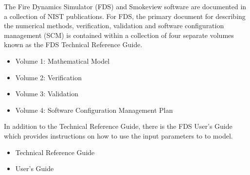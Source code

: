\documentclass[10pt]{article}
\begin{document}
The Fire Dynamics Simulator (FDS) and Smokeview software are documented in a collection of NIST publications.
For FDS, the primary document for describing the numerical methods, verification, validation and software configuration management (SCM) is contained within a collection of four separate volumes known as the FDS Technical Reference Guide.
\newline


\begin{itemize}
\item{Volume 1: Mathematical Model\cite{FDS_Math_Guide_5}}
\item{Volume 2: Verification\cite{FDS_Verification_Guide_5}}
\item{Volume 3: Validation\cite{FDS_Validation_Guide_5}}
\item{Volume 4: Software Configuration Management Plan\cite{FDS_Configuration_Management_Plan_5}}
\end{itemize}

In addition to the Technical Reference Guide, there is the FDS User's Guide\cite{FDS_Users_Guide_5} which provides instructions on how to use the input parameters to to model.
\newline

\begin{itemize}
\item{Technical Reference Guide\cite{Smokeview_Tech_Guide_5}}
\item{User's Guide\cite{Smokeview_Users_Guide_5}}
\end{itemize}



\end{document}
